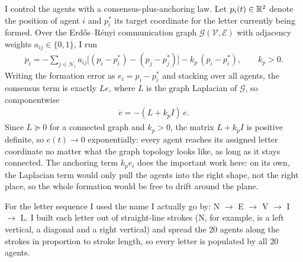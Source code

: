 \documentclass[a4paper, 11pt]{article}
\begin{document}
\begin{solution}
I control the agents with a consensus-plus-anchoring law. Let $p_i(t)\in\mathbb{R}^2$ denote the position of agent $i$ and $p_i^*$ its target coordinate for the letter currently being formed. Over the Erd\H{o}s--R\'enyi communication graph $\mathcal{G}(\mathcal{V},\mathcal{E})$ with adjacency weights $a_{ij}\in\{0,1\}$, I run
\begin{align*}
    \dot p_i = -\sum_{j\in\mathcal{N}_i}a_{ij}\Big[(p_i-p_i^*)-(p_j-p_j^*)\Big] - k_p\,(p_i-p_i^*), \qquad k_p>0.
\end{align*}
Writing the formation error as $e_i=p_i-p_i^*$ and stacking over all agents, the consensus term is exactly $Le$, where $L$ is the graph Laplacian of $\mathcal{G}$, so componentwise
\begin{align*}
    \dot e = -(L+k_pI)\,e.
\end{align*}
Since $L\succeq 0$ for a connected graph and $k_p>0$, the matrix $L+k_pI$ is positive definite, so $e(t)\to 0$ exponentially: every agent reaches its assigned letter coordinate no matter what the graph topology looks like, as long as it stays connected. The anchoring term $k_pe_i$ does the important work here: on its own, the Laplacian term would only pull the agents into the right shape, not the right place, so the whole formation would be free to drift around the plane.

For the letter sequence I used the name I actually go by: N $\to$ E $\to$ V $\to$ I $\to$ L. I built each letter out of straight-line strokes (N, for example, is a left vertical, a diagonal and a right vertical) and spread the $20$ agents along the strokes in proportion to stroke length, so every letter is populated by all $20$ agents.


\end{solution}
\end{document}
